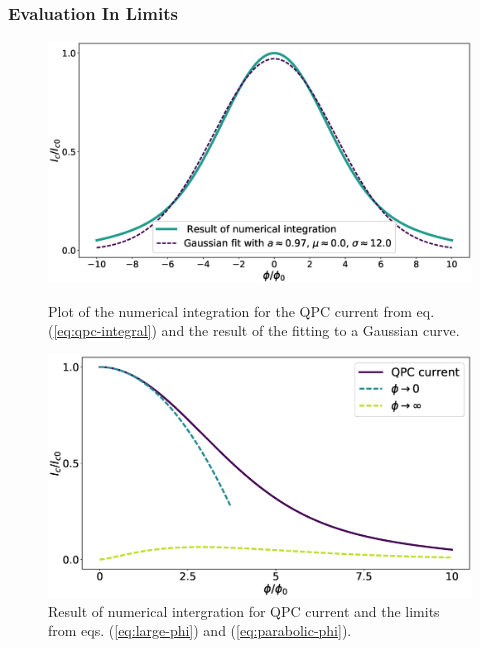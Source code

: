 \subsubsection*{Evaluation In Limits}
\begin{figure}[ht]
\begin{minipage}[b]{0.49\linewidth}
\centering
\includegraphics[width=\textwidth]{figure/analyticalmodel/qpc-numerical-integration-fit}
\caption{Plot of the numerical integration for the QPC current from eq. (\ref{eq:qpc-integral}) and the result of the fitting to a Gaussian curve.} \label{fig:ic-qpc-gauss}
\end{minipage}
\hspace{0.5cm}
\begin{minipage}[b]{0.49\linewidth}
\centering
\includegraphics[width=\textwidth]{figure/analyticalmodel/limits-phi}
\caption{Result of numerical intergration for QPC current and the limits from eqs. (\ref{eq:large-phi}) and (\ref{eq:parabolic-phi}).}\label{fig:ic-qpc-limits-phi}
\end{minipage}
\end{figure}
